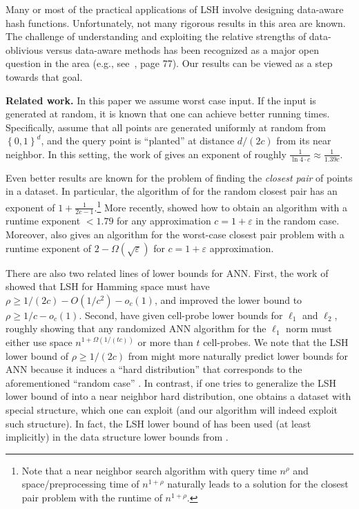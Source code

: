 \documentclass[11pt,letterpaper]{article}
\newcommand{\set}[1]{\left\{#1\right\}}
\newcommand{\eps}{\varepsilon}
\renewcommand{\paragraph}[1]{{\bf #1.}}
\begin{document}
Many or most of the practical applications of LSH involve designing data-aware hash functions. 
Unfortunately, not many rigorous results in this area are known. 
The challenge of understanding and exploiting the relative strengths of data-oblivious versus data-aware methods has been recognized as a major open question in the area (e.g., see~\cite{fmda-13}, page 77). 
Our results can be viewed as a step towards that goal.


\paragraph{Related work}
In this paper we assume worst case input.  If the input is generated
at random, it is known that one can achieve better running
times. Specifically, assume that all points are generated uniformly at
random from $\set{0,1}^d$, and the query point is ``planted'' at
distance $d/(2c)$ from its near neighbor. In this setting, the work of
\cite{cr-fflas-93, gpy-mihir-94, kwz-bvipp-95, prr-lbp-95} gives an exponent of roughly $\tfrac{1}{\ln
  4\cdot c}\approx \tfrac{1}{1.39c}$.

Even better results are known for the problem of finding the {\em
  closest pair} of points in a dataset. In particular, the algorithm
of \cite{d-bcits-10} for the random closest pair has an exponent of
$1+\tfrac{1}{2c-1}$.\footnote{Note that a near neighbor search
  algorithm with query time $n^\rho$ and space/preprocessing time of
  $n^{1+\rho}$ naturally leads to a solution for the closest pair
  problem with the runtime of $n^{1+\rho}$.} More recently, \cite{v-fcsta-12}
showed how to obtain an algorithm with a runtime exponent $<1.79$ for
any approximation $c=1+\eps$ in the random case. Moreover, \cite{v-fcsta-12}
also gives an algorithm for the worst-case closest pair problem with a
runtime exponent of $2-\Omega(\sqrt{\eps})$ for $c=1+\eps$
approximation.

There are also two related lines of lower bounds for ANN. First, the work of \cite{mnp-lblsh-07} showed that LSH for Hamming space must have $\rho\ge 1/(2c)-O(1/c^2)-o_c(1)$, and \cite{owz-olbls-11} improved the lower bound to $\rho\ge 1/c-o_c(1)$. Second, \cite{ptw-galba-08,ptw-lbnns-10} have given cell-probe lower bounds for $\ell_1$ and $\ell_2$, roughly showing that any randomized ANN algorithm for the $\ell_1$ norm must either use space $n^{1+\Omega(1/(tc))}$ or more than $t$ cell-probes. We note that the LSH lower bound of $\rho\ge 1/(2c)$ from \cite{mnp-lblsh-07} might more naturally predict lower bounds for ANN because it induces a ``hard distribution'' that corresponds to the aforementioned ``random case'' . In contrast, if one tries to generalize the LSH lower bound of \cite{owz-olbls-11} into a near neighbor hard distribution, one obtains a dataset with special structure, which one can exploit (and our algorithm will indeed exploit such structure). In fact, the LSH lower bound of \cite{mnp-lblsh-07} has been used (at least implicitly) in the data structure lower bounds from \cite{ptw-galba-08, ptw-lbnns-10}.
\end{document}
